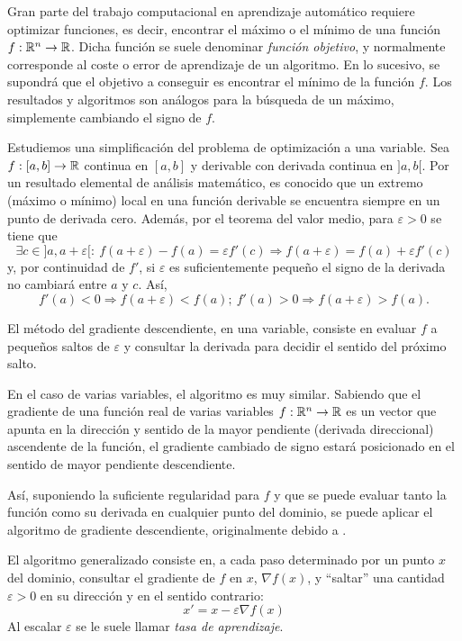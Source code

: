Gran parte del trabajo computacional en aprendizaje automático requiere
optimizar funciones, es decir, encontrar el máximo o el mínimo de una
función \(f:\mathbb{R}^n\rightarrow \mathbb{R}\). Dicha función se suele denominar
\emph{función objetivo}, y normalmente corresponde al coste o error de
aprendizaje de un algoritmo. En lo sucesivo, se supondrá que el objetivo
a conseguir es encontrar el mínimo de la función \(f\). Los resultados y
algoritmos son análogos para la búsqueda de un máximo, simplemente
cambiando el signo de \(f\).

Estudiemos una simplificación del problema de optimización a una
variable. Sea \(f:[a,b]\rightarrow\mathbb{R}\) continua en \([a,b]\) y
derivable con derivada continua en \(]a,b[\). Por un resultado elemental
de análisis matemático, es conocido que un extremo (máximo o mínimo)
local en una función derivable se encuentra siempre en un punto de
derivada cero. Además, por el teorema del valor medio, para
\(\varepsilon>0\) se tiene que
\[\exists c\in ]a, a+\varepsilon[ :\ f(a+\varepsilon)-f(a)=\varepsilon f'(c)\Rightarrow f(a+\varepsilon)=f(a) + \varepsilon f'(c)\]
y, por continuidad de \(f'\), si \(\varepsilon\) es suficientemente
pequeño el signo de la derivada no cambiará entre \(a\) y \(c\). Así,
\[f'(a)<0\Rightarrow f(a+\varepsilon) < f(a);\ f'(a)>0\Rightarrow f(a+\varepsilon) > f(a).\]

El método del gradiente descendiente, en una variable, consiste en
evaluar \(f\) a pequeños saltos de \(\varepsilon\) y consultar la
derivada para decidir el sentido del próximo salto.

En el caso de varias variables, el algoritmo es muy similar. Sabiendo
que el gradiente de una función real de varias variables
\(f:\mathbb{R}^n\rightarrow \mathbb{R}\) es un vector que apunta en la dirección y
sentido de la mayor pendiente (derivada direccional) ascendente de la
función, el gradiente cambiado de signo estará posicionado en el sentido
de mayor pendiente descendiente.

Así, suponiendo la suficiente regularidad para \(f\) y que se puede
evaluar tanto la función como su derivada en cualquier punto del
dominio, se puede aplicar el algoritmo de gradiente descendiente,
originalmente debido a \textcite{cauchy1847}.

El algoritmo generalizado consiste en, a cada paso determinado por un
punto \(x\) del dominio, consultar el gradiente de \(f\) en \(x\),
\(\nabla f(x)\), y ``saltar'' una cantidad \(\varepsilon>0\) en su
dirección y en el sentido contrario: \[x' = x - \varepsilon\nabla f(x)\]
Al escalar \(\varepsilon\) se le suele llamar \emph{tasa de
aprendizaje}.

